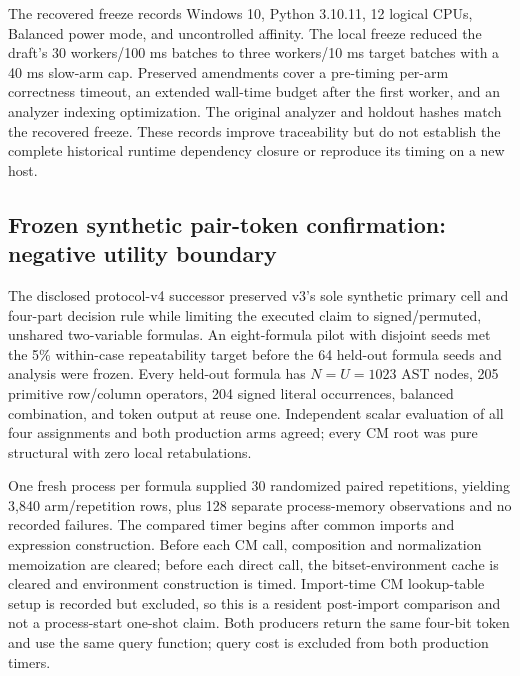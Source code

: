 \documentclass[10pt]{article}
\theoremstyle{plain}
\theoremstyle{definition}
\theoremstyle{remark}
\begin{document}
The recovered freeze records Windows 10, Python 3.10.11, 12 logical CPUs, Balanced power mode, and uncontrolled affinity. The local freeze reduced the draft's 30 workers/100 ms batches to three workers/10 ms target batches with a 40 ms slow-arm cap. Preserved amendments cover a pre-timing per-arm correctness timeout, an extended wall-time budget after the first worker, and an analyzer indexing optimization. The original analyzer and holdout hashes match the recovered freeze. These records improve traceability but do not establish the complete historical runtime dependency closure or reproduce its timing on a new host.

\subsection{Frozen synthetic pair-token confirmation: negative utility boundary}
\label{sec:v4-primary}

The disclosed protocol-v4 successor \cite{ProtocolV4} preserved v3's sole synthetic primary cell and four-part decision rule while limiting the executed claim to signed/permuted, unshared two-variable formulas. An eight-formula pilot with disjoint seeds met the 5\% within-case repeatability target before the 64 held-out formula seeds and analysis were frozen. Every held-out formula has $N=U=1023$ AST nodes, 205 primitive row/column operators, 204 signed literal occurrences, balanced combination, and token output at reuse one. Independent scalar evaluation of all four assignments and both production arms agreed; every CM root was pure structural with zero local retabulations.

One fresh process per formula supplied 30 randomized paired repetitions, yielding 3,840 arm/repetition rows, plus 128 separate process-memory observations and no recorded failures. The compared timer begins after common imports and expression construction. Before each CM call, composition and normalization memoization are cleared; before each direct call, the bitset-environment cache is cleared and environment construction is timed. Import-time CM lookup-table setup is recorded but excluded, so this is a resident post-import comparison and not a process-start one-shot claim. Both producers return the same four-bit token and use the same query function; query cost is excluded from both production timers.
\end{document}
